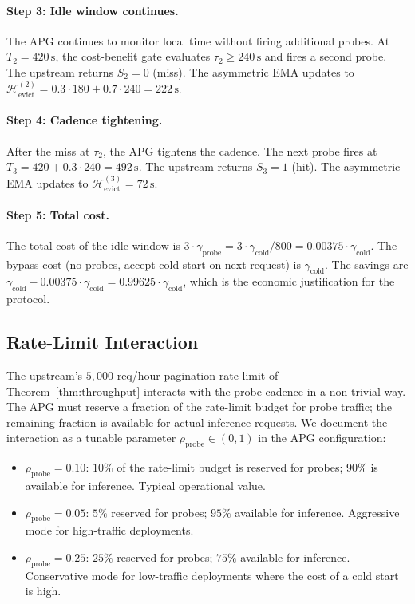 \paragraph{Step 3: Idle window continues.}
The APG continues to monitor local time without firing additional
probes. At $T_2 = 420\,\text{s}$, the cost-benefit gate evaluates
$\tau_2 \ge 240\,\text{s}$ and fires a second probe. The upstream
returns $S_2 = 0$ (miss). The asymmetric EMA updates to
$\mathcal{H}_{\text{evict}}^{(2)} = 0.3 \cdot 180 + 0.7 \cdot 240
= 222\,\text{s}$.

\paragraph{Step 4: Cadence tightening.}
After the miss at $\tau_2$, the APG tightens the cadence. The next
probe fires at $T_3 = 420 + 0.3 \cdot 240 = 492\,\text{s}$. The
upstream returns $S_3 = 1$ (hit). The asymmetric EMA updates to
$\mathcal{H}_{\text{evict}}^{(3)} = 72\,\text{s}$.

\paragraph{Step 5: Total cost.}
The total cost of the idle window is $3 \cdot \gamma_{\text{probe}} =
3 \cdot \gamma_{\text{cold}} / 800 = 0.00375 \cdot \gamma_{\text{cold}}$.
The bypass cost (no probes, accept cold start on next request) is
$\gamma_{\text{cold}}$. The savings are
$\gamma_{\text{cold}} - 0.00375 \cdot \gamma_{\text{cold}} = 0.99625
\cdot \gamma_{\text{cold}}$, which is the economic justification for
the protocol.

\subsection{Rate-Limit Interaction}

The upstream's $5{,}000$-req/hour pagination rate-limit of
Theorem~\ref{thm:throughput} interacts with the probe cadence in a
non-trivial way. The APG must reserve a fraction of the rate-limit
budget for probe traffic; the remaining fraction is available for
actual inference requests. We document the interaction as a tunable
parameter $\rho_{\text{probe}} \in (0, 1)$ in the APG configuration:
\begin{itemize}
\item $\rho_{\text{probe}} = 0.10$: $10\%$ of the rate-limit budget
is reserved for probes; $90\%$ is available for inference. Typical
operational value.
\item $\rho_{\text{probe}} = 0.05$: $5\%$ reserved for probes;
$95\%$ available for inference. Aggressive mode for high-traffic
deployments.
\item $\rho_{\text{probe}} = 0.25$: $25\%$ reserved for probes;
$75\%$ available for inference. Conservative mode for low-traffic
deployments where the cost of a cold start is high.
\end{itemize}

